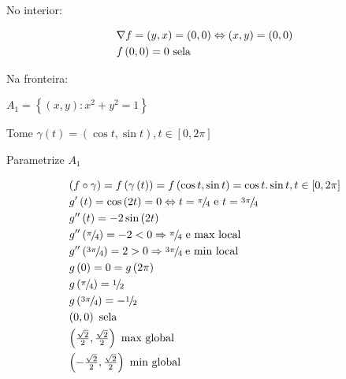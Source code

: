 \documentclass[11pt, oneside, a4paper]{gsm-l}
\begin{document}
\begin{sol}
No interior:

\[
\begin{gathered}
      \nabla f = \left( {y,x} \right) = \left( {0,0} \right) \Leftrightarrow \left( {x,y} \right) = \left( {0,0} \right) \hfill \\
f\left( {0,0} \right) = 0{\text{ sela}} \hfill \\
\end{gathered}
\]

Na fronteira:

$A_1  = \left\{ {\left( {x,y} \right):x^2  + y^2  = 1} \right\}$

    Tome $\gamma \left( t \right) = \left( {\cos t,\sin t} \right),t \in \left[ {0,2\pi } \right]$

Parametrize $A_1$

\[
\begin{gathered}
  \left( {f \circ \gamma } \right) = f\left( {\gamma \left( t \right)} \right) = f\left( {\cos t,\sin t} \right) = \cos t.\sin t,t \in \left[ {0,2\pi } \right] \hfill \\
  g'\left( t \right) = \cos \left( {2t} \right) = 0 \Leftrightarrow t = {\raise0.5ex\hbox{$\scriptstyle \pi $}
\kern-0.1em/\kern-0.15em
\lower0.25ex\hbox{$\scriptstyle 4$}}{\text{ e }}t = {\raise0.5ex\hbox{$\scriptstyle {3\pi }$}
\kern-0.1em/\kern-0.15em
\lower0.25ex\hbox{$\scriptstyle 4$}} \hfill \\
g''\left( t \right) =  - 2\sin \left( {2t} \right) \hfill \\
g''\left( {{\raise0.5ex\hbox{$\scriptstyle \pi $}
\kern-0.1em/\kern-0.15em
\lower0.25ex\hbox{$\scriptstyle 4$}}} \right) =  - 2 < 0 \Rightarrow {\raise0.5ex\hbox{$\scriptstyle \pi $}
\kern-0.1em/\kern-0.15em
\lower0.25ex\hbox{$\scriptstyle 4$}}{\text{ e max local}} \hfill \\
g''\left( {{\raise0.5ex\hbox{$\scriptstyle {3\pi }$}
\kern-0.1em/\kern-0.15em
\lower0.25ex\hbox{$\scriptstyle 4$}}} \right) = 2 > 0 \Rightarrow {\raise0.5ex\hbox{$\scriptstyle {3\pi }$}
\kern-0.1em/\kern-0.15em
\lower0.25ex\hbox{$\scriptstyle 4$}}\;{\text{e min local}} \hfill \\
g\left( 0 \right) = 0 = g\left( {2\pi } \right) \hfill \\
g\left( {{\raise0.5ex\hbox{$\scriptstyle \pi $}
\kern-0.1em/\kern-0.15em
\lower0.25ex\hbox{$\scriptstyle 4$}}} \right) = {\raise0.5ex\hbox{$\scriptstyle 1$}
\kern-0.1em/\kern-0.15em
\lower0.25ex\hbox{$\scriptstyle 2$}} \hfill \\
g\left( {{\raise0.5ex\hbox{$\scriptstyle {3\pi }$}
\kern-0.1em/\kern-0.15em
\lower0.25ex\hbox{$\scriptstyle 4$}}} \right) =  - {\raise0.5ex\hbox{$\scriptstyle 1$}
\kern-0.1em/\kern-0.15em
\lower0.25ex\hbox{$\scriptstyle 2$}} \hfill \\
\left( {0,0} \right){\text{ sela}} \hfill \\
\left( {\tfrac{{\sqrt 2 }}
{2},\tfrac{{\sqrt 2 }}
{2}} \right){\text{ max global}} \hfill \\
\left( { - \tfrac{{\sqrt 2 }}
{2},\tfrac{{\sqrt 2 }}
{2}} \right){\text{ min global}} \hfill \\
\end{gathered}
\]


\end{sol}
\end{document}
